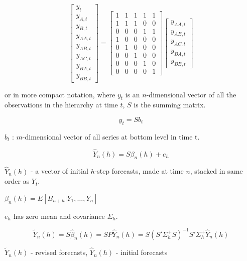 \documentclass[12pt,a4paper, oneside]{extreport}
\begin{document}
\[\begin{bmatrix}
y_{t} \\
y_{A, t} \\
y_{B, t} \\
y_{AA, t} \\
y_{AB, t} \\
y_{AC, t} \\
y_{BA, t} \\
y_{BB, t}
\end{bmatrix}
=
\begin{bmatrix}
1 & 1 & 1 & 1 & 1 \\
1 & 1 & 1 & 0 & 0 \\
0 & 0 & 0 & 1 & 1 \\
1  & 0  & 0  & 0  & 0  \\
0  & 1  & 0  & 0  & 0  \\
0  & 0  & 1  & 0  & 0  \\
0  & 0  & 0  & 1  & 0  \\
0  & 0  & 0  & 0  & 1
\end{bmatrix}
\begin{bmatrix}
y_{AA, t} \\
y_{AB, t} \\
y_{AC, t} \\
y_{BA, t} \\
y_{BB, t}
\end{bmatrix}\]


or in more compact notation,  where  $y_t$   is an $n$-dimensional vector of all the observations in the hierarchy at time $t$, $S$  is the summing matrix.

$$y_t  = S b_t$$


$ b_t $ : $m$-dimensional vector of all series at
bottom level in time t.





\[ \hat{Y}_n ( h ) = S \beta_n ( h ) + e_h  \]

$ \hat{Y}_n ( h ) $ - a vector of initial $ h $-step forecasts,
made at time $ n $, stacked in same order as $ Y_t  $.

$ \beta_n ( h )   = E [ B _{n + h} | Y_1 , \dots , Y_n ]  $

$ e_h  $  has zero mean and covariance $ \Sigma_h  $.

\[ \tilde{Y}_n ( h )
= S \hat{\beta}_n ( h ) = S P  \hat{Y}_n ( h ) =  S ( S' \Sigma^{+}_h S )^{-1}  S'  \Sigma^{+}_h  \hat{Y}_n ( h )
\]

$ \tilde{Y}_n ( h ) $   - revised forecasts, 
$ \hat{Y}_n ( h ) $ - initial forecasts
\end{document}
